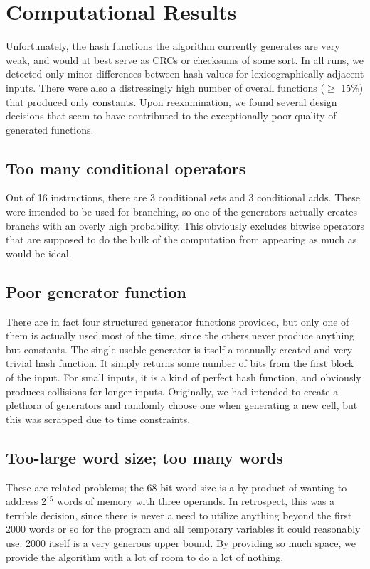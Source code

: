 \documentclass{article}
\begin{document}
\section{Computational Results}
Unfortunately, the hash functions the algorithm currently generates are very weak, and would at best serve as CRCs or checksums of some sort. In all runs, we detected only minor differences between hash values for lexicographically adjacent inputs.
There were also a distressingly high number of overall functions ($\geq$ 15\%) that produced only constants. Upon reexamination, we found several design decisions that seem to have contributed to the exceptionally poor quality of generated functions.

\subsection{Too many conditional operators}
Out of 16 instructions, there are 3 conditional sets and 3 conditional adds. These were intended to be used for branching, so one of the generators actually creates branchs with an overly high probability. This obviously excludes bitwise operators that are supposed to do the bulk of the computation from appearing as much as would be ideal.

\subsection{Poor generator function}
There are in fact four structured generator functions provided, but only one of them is actually used most of the time, since the others never produce anything but constants. The single usable generator is itself a manually-created and very trivial hash function. It simply returns some number of bits from the first block of the input. For small inputs, it is a kind of perfect hash function, and obviously produces collisions for longer inputs. Originally, we had intended to create a plethora of generators and randomly choose one when generating a new cell, but this was scrapped due to time constraints.

\subsection{Too-large word size; too many words}
These are related problems; the 68-bit word size is a by-product of wanting to address 2$^{15}$ words of memory with three operands. In retrospect, this was a terrible decision, since there is never a need to utilize anything beyond the first 2000 words or so for the program and all temporary variables it could reasonably use. 2000 itself is a very generous upper bound. By providing so much space, we provide the algorithm with a lot of room to do a lot of nothing.
\end{document}
